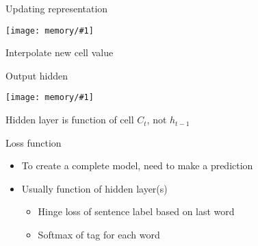 \documentclass[compress]{beamer}
\newcommand{\gfx}[2]{
\begin{center}
	\texttt{[image: memory/\#1]}
\end{center}
}
\begin{document}
\begin{frame}{Updating representation}

  \gfx{LSTM3-focus-C}{.9}

  Interpolate new cell value

\end{frame}

\begin{frame}{Output hidden}

  \gfx{LSTM3-focus-o}{.9}

  Hidden layer is function of cell $C_t$, not $h_{t-1}$

\end{frame}

\begin{frame}{Loss function}

  \begin{itemize}
    \item To create a complete model, need to make a prediction
    \item Usually function of hidden layer(s)
      \begin{itemize}
        \item Hinge loss of sentence label based on last word
        \item Softmax of tag for each word
      \end{itemize}
  \end{itemize}

\end{frame}
\end{document}
